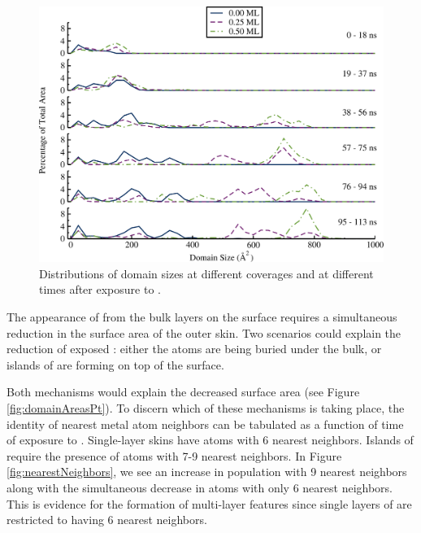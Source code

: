 \begin{figure}[p!]
\centering
\includegraphics[width=\linewidth]{../figures/chap3/domains_Pd_110ns.pdf}
\caption{Distributions of  domain sizes at different 
  coverages and at different times after exposure to .}
\label{fig:domainAreasPd} 
\end{figure}

The appearance of  from the bulk layers on the surface requires
a simultaneous reduction in the surface area of the outer 
skin. Two scenarios could explain the reduction of exposed :
either the  atoms are being buried under the  bulk, or
islands of  are forming on top of the  surface.

Both mechanisms would explain the decreased  surface area (see
Figure \ref{fig:domainAreasPt}).  To discern which of these mechanisms
is taking place, the identity of nearest metal atom neighbors can be
tabulated as a function of time of exposure to . Single-layer
 skins have atoms with 6  nearest neighbors. Islands of
 require the presence of  atoms with 7-9  nearest
neighbors. In Figure \ref{fig:nearestNeighbors}, we see an increase in
 population with 9  nearest neighbors along with the
simultaneous decrease in  atoms with only 6  nearest
neighbors.  This is evidence for the formation of multi-layer 
features since single layers of  are restricted to having 6
 nearest neighbors.

